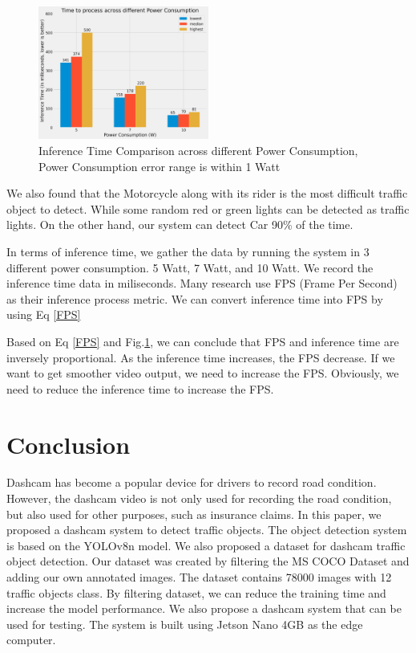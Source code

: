 \documentclass[conference]{IEEEtran}
\begin{document}
\begin{figure}[h!]
\centering
\includegraphics[width=0.5\textwidth,keepaspectratio]{inference_time_comparison.png}
\caption{Inference Time Comparison across different Power Consumption, Power Consumption error range is within 1 Watt}
\label{fig:inference_time_comparison}
\end{figure}
We also found that the Motorcycle along with its rider is the most difficult traffic object to detect. While some random red or green lights can be detected as traffic lights.
On the other hand, our system can detect Car 90\% of the time.

In terms of inference time, we gather the data by running the system in 3 different power consumption. 5 Watt, 7 Watt, and 10 Watt. We record the inference time data in miliseconds.
Many research use  FPS (Frame Per Second) as their inference process metric. We can convert inference time into FPS by using Eq \eqref{FPS}

Based on Eq \eqref{FPS} and Fig.\ref{fig:inference_time_comparison}, we can conclude that FPS and inference time are inversely proportional. As the inference time increases, the FPS decrease.
If we want to get smoother video output, we need to increase the FPS. Obviously, we need to reduce the inference time to increase the FPS.

\section{Conclusion}
Dashcam has become a popular device for drivers to record road condition. However, the dashcam video is not only used for recording the road condition, but also used for other purposes, such as insurance claims.
In this paper, we proposed a dashcam system to detect traffic objects. The object detection system is based on the YOLOv8n model. We also proposed a dataset for dashcam traffic object detection. Our dataset was created by filtering the MS COCO Dataset and adding our own annotated images. The dataset contains 78000 images with 12 traffic objects class.
By filtering dataset, we can reduce the training time and increase the model performance.
We also propose a dashcam system that can be used for testing. The system is built using Jetson Nano 4GB as the edge computer.
\end{document}
